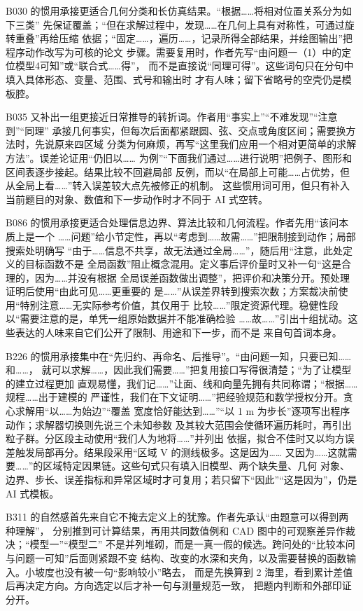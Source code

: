 B030 的惯用承接更适合几何分类和长仿真结果。“根据……将相对位置关系分为如下三类”
先保证覆盖；“但在求解过程中，发现……在几何上具有对称性，可通过旋转重叠”再给压缩
依据；“固定……，遍历……，记录所得全部结果，并绘图输出”把程序动作改写为可核的论文
步骤。需要复用时，作者先写“由问题一（1）中的定位模型4可知”或“联合式……得”，
而不是直接说“同理可得”。这些词句只在分句中填入具体形态、变量、范围、式号和输出时
才有人味；留下省略号的空壳仍是模板腔。

B035 又补出一组更接近日常推导的转折词。作者用“事实上”“不难发现”“注意到”“同理”
承接几何事实，但每次后面都紧跟圆、弦、交点或角度区间；需要换方法时，先说原来四区域
分类为何麻烦，再写“这里我们应用一个相对更简单的求解方法”。误差论证用“仍旧以……
为例”“下面我们通过……进行说明”把例子、图形和区间表逐步接起。结果比较不回避局部
反例，而以“在局部上可能……占优势，但从全局上看……”转入误差较大点先被修正的机制。
这些惯用词可用，但只有补入当前题目的对象、数值和下一步动作时才不同于 AI 式空转。

B086 的惯用承接更适合处理信息边界、算法比较和几何流程。作者先用“该问本质上是一个
……问题”给小节定性，再以“考虑到……故需……”把限制接到动作；局部搜索处明确写
“由于……信息不共享，故无法通过全局……”，随后用“注意，此处定义的目标函数不是
全局函数”阻止概念混用。定义事后评价量时又补一句“这是合理的，因为……并没有根据
全局误差函数做出调整”，把评价和决策分开。预处理证明后使用“由此可见……更重要的
是……”从误差界转到搜索次数；方案裁决前使用“特别注意……无实际参考价值，其仅用于
比较……”限定资源代理。稳健性段以“需要注意的是，单凭一组原始数据并不能准确检验
……故……”引出十组扰动。这些表达的人味来自它们公开了限制、用途和下一步，而不是
来自句首词本身。

B226 的惯用承接集中在“先归约、再命名、后推导”。“由问题一知，只要已知……和……，
就可以求解……，因此我们需要……”把复用接口写得很清楚；“为了让模型的建立过程更加
直观易懂，我们记……”让面、线和向量先拥有共同称谓；“根据……规程……出于建模的
严谨性，我们在下文证明……”把经验规范和数学授权分开。贪心求解用“以……为始边”“覆盖
宽度恰好能达到……”“以 1 m 为步长”逐项写出程序动作；求解器切换则先说三个未知参数
及其较大范围会使循环遍历耗时，再引出粒子群。分区段主动使用“我们人为地将……”并列出
依据，拟合不佳时又以均方误差触发局部再分。结果段采用“区域 V 的测线极多。这是因为……
又因为……这就需要……”的区域特定因果链。这些句式只有填入旧模型、两个缺失量、几何
对象、边界、步长、误差指标和异常区域时才可复用；若只留下“因此”“这是因为”，仍是 AI
式模板。

B311 的自然感首先来自它不掩去定义上的犹豫。作者先承认“由题意可以得到两种理解”，
分别推到可计算结果，再用共同数值例和 CAD 图中的可观察差异作裁决；“模型一”“模型二”
不是并列堆砌，而是一真一假的候选。跨问处的“比较本问与问题一可知”后面则紧跟不变
结构、改变的水深和夹角，以及需要替换的函数输入。小坡度也没有被一句“影响较小”略去，
而是先换算到 2 海里，看到累计差值后再决定方向。方向选定以后才补一句与测量规范一致，
把题内判断和外部印证分开。

